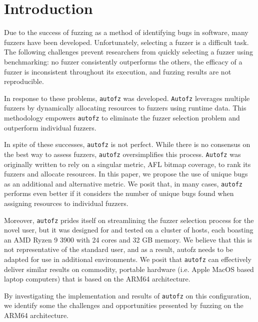 \section{Introduction}

Due to the success of fuzzing as a method of identifying bugs in software, many fuzzers have been 
developed. Unfortunately, selecting a fuzzer is a difficult task. The following challenges prevent 
researchers from quickly selecting a fuzzer using benchmarking: no fuzzer consistently outperforms 
the others, the efficacy of a fuzzer is inconsistent throughout its execution, and fuzzing results 
are not reproducible.

In response to these problems, \texttt{autofz} was developed. \texttt{Autofz} leverages multiple fuzzers by dynamically 
allocating resources to fuzzers using runtime data. This methodology empowers \texttt{autofz} to eliminate the 
fuzzer selection problem and outperform individual fuzzers.

In spite of these successes, \texttt{autofz} is not perfect. While there is no consensus on the best way to 
assess fuzzers, \texttt{autofz} oversimplifies this process. \texttt{Autofz} was originally written to rely on a 
singular metric, AFL bitmap coverage, to rank its fuzzers and allocate resources. In this paper, we
propose the use of unique bugs as an additional and alternative metric. We posit that, in 
many cases, \texttt{autofz} performs even better if it considers the number of unique bugs found when assigning 
resources to individual fuzzers.

Moreover, \texttt{autofz} prides itself on streamlining the fuzzer selection process for the novel user, but 
it was designed for and tested on a cluster of hosts, each boasting an AMD Ryzen 9 3900 with 24 cores 
and 32 GB memory. We believe that this is not representative of the standard user, and as a result, 
autofz needs to be adapted for use in additional environments. \cite{fu_autofz_2023} We posit that \texttt{autofz} can 
effectively deliver similar results on commodity, portable hardware (i.e. Apple MacOS based laptop 
computers) that is based on the ARM64 architecture. 

By investigating the implementation and results of \texttt{autofz} on this configuration, we identify some the 
challenges and opportunities presented by fuzzing on the ARM64 architecture.

